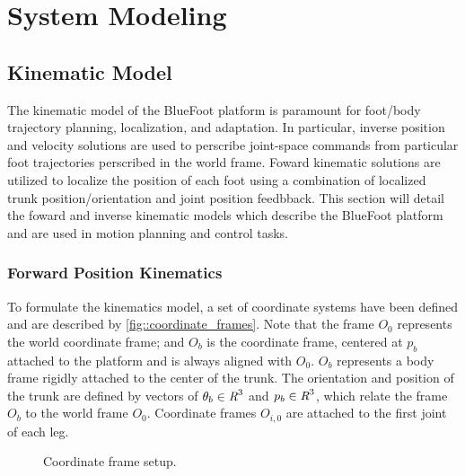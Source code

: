 \chapter{System Modeling}
\label{ch::system_modeling}

	
	\section{Kinematic Model}

		The kinematic model of the BlueFoot platform is paramount for foot/body trajectory planning, localization, and adaptation. In particular, inverse position and velocity solutions are used to perscribe joint-space commands from particular foot trajectories perscribed in the world frame. Foward kinematic solutions are utilized to localize the position of each foot using a combination of localized trunk position/orientation and joint position feedbback. This section will detail the foward and inverse kinematic models which describe the BlueFoot platform and are used in motion planning and control tasks.

		\subsection{Forward Position Kinematics}

			To formulate the kinematics model, a set of coordinate systems have been defined and are described by \ref{fig::coordinate_frames}. Note that the frame $O_{0}$ represents the world coordinate frame; and $O_{b}$ is the coordinate frame, centered at  ${p}_{b}$ attached to the platform and is always aligned with $O_{0}$. $O_{b}$ represents a body frame rigidly attached to the center of the trunk. The orientation and position of the trunk are defined by vectors of $\theta_{b}\in\emph{R}^{3}$ and ${p}_{b}\in\emph{R}^{3}$, which relate the frame $O_{b}$ to the world frame $O_{0}$. Coordinate frames $O_{i,0}$ are attached to the first joint of each \Ith leg.

				\begin{figure}[h!]
					\centering
					\caption{Coordinate frame setup.}
					\label{fig::narx_net}
				\end{figure}

